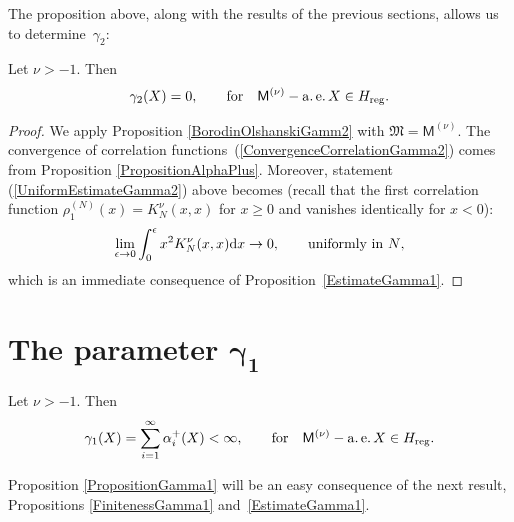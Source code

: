 The proposition above, along with the results of the previous sections, allows us to determine~$\gamma_2$:

\begin{Proposition}\label{PropositionGamma2}
Let $\nu>-1$. Then
\begin{gather*}
\gamma_2(X)=0, \qquad \text{for} \quad \mathsf{M}^{(\nu)}-\operatorname{a.e.} X \in H_{{\rm reg}}.
\end{gather*}
\end{Proposition}

\begin{proof} We apply Proposition \ref{BorodinOlshanskiGamm2} with $\mathfrak{M}=\mathsf{M}^{(\nu)}$. The convergence of correlation functions~(\ref{ConvergenceCorrelationGamma2}) comes from Proposition \ref{PropositionAlphaPlus}. Moreover,
statement (\ref{UniformEstimateGamma2}) above becomes (recall that the first correlation function $\rho_1^{(N)}(x)=K_N^{\nu}(x,x)$ for $x\ge 0$ and vanishes identically for $x<0$):
\begin{gather*}
\lim_{\epsilon \to 0} \int_{0}^{\epsilon}x^2 K_N^{\nu}(x,x){\rm d}x \to 0, \qquad \text{uniformly in $N$},
\end{gather*}
which is an immediate consequence of Proposition~\ref{EstimateGamma1}.
\end{proof}

\section[The parameter $\gamma_1$]{The parameter $\boldsymbol{\gamma_1}$}\label{section7}

\begin{Proposition}\label{PropositionGamma1}
Let $\nu>-1$. Then
\begin{gather*}
\gamma_1(X)=\sum_{i=1}^{\infty}\alpha_i^+(X)<\infty, \qquad \text{for} \quad \mathsf{M}^{(\nu)}-\operatorname{a.e.} X \in H_{{\rm reg}}.
\end{gather*}
\end{Proposition}

Proposition \ref{PropositionGamma1} will be an easy consequence of the next result, Propositions \ref{FinitenessGamma1} and~\ref{EstimateGamma1}.

